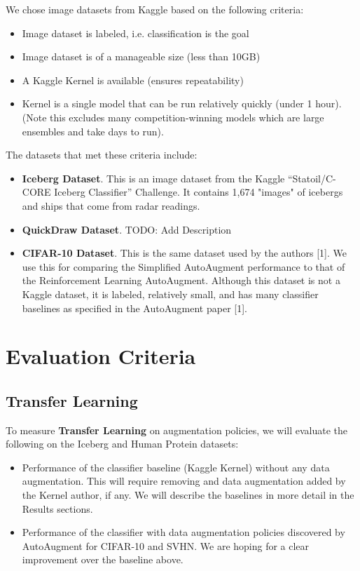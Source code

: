 \documentclass[10pt,twocolumn,letterpaper]{article}
\begin{document}
We chose image datasets from Kaggle based on the following criteria:

\begin{itemize}
  \item Image dataset is labeled, i.e. classification is the goal
  \item Image dataset is of a manageable size (less than 10GB)
  \item A Kaggle Kernel is available (ensures repeatability)
  \item Kernel is a single model that can be run relatively quickly (under 1 hour).  (Note this excludes many competition-winning models which are large ensembles and take days to run).
\end{itemize}

The datasets that met these criteria include:

\begin{itemize}
  \item \textbf{Iceberg Dataset}.  This is an image dataset from the Kaggle “Statoil/C-CORE Iceberg Classifier” Challenge.  It contains 1,674 "images" of icebergs and ships that come from radar readings.  
  \item \textbf{QuickDraw Dataset}.  TODO: Add Description
  \item \textbf{CIFAR-10 Dataset}.  This is the same dataset used by the authors [1].  We use this for comparing the Simplified AutoAugment performance to that of the Reinforcement Learning AutoAugment.  Although this dataset is not a Kaggle dataset, it is labeled, relatively small, and has many classifier baselines as specified in the AutoAugment paper [1].        
\end{itemize}


\section{Evaluation Criteria}

\subsection{Transfer Learning}

To measure \textbf{Transfer Learning} on augmentation policies, we will evaluate the following on the Iceberg and Human Protein datasets:

\begin{itemize}
  \item Performance of the classifier baseline (Kaggle Kernel) without any data augmentation.  This will require removing and data augmentation added by the Kernel author, if any.  We will describe the baselines in more detail in the Results sections.
  \item Performance of the classifier with data augmentation policies discovered by AutoAugment for CIFAR-10 and SVHN.  We are hoping for a clear improvement over the baseline above.
\end{itemize}
\end{document}
